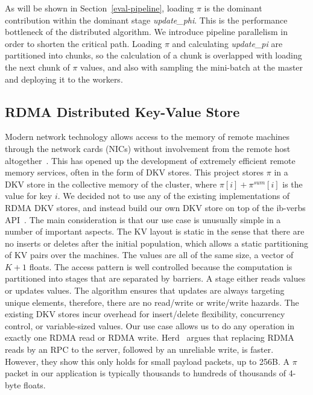 As will be shown in Section~\ref{eval-pipeline}, loading $\pi$ is the
dominant contribution within the dominant stage \textit{update\_phi}. This
is the performance bottleneck of the distributed algorithm. We introduce
pipeline parallelism in order to shorten the critical path. Loading $\pi$
and calculating \textit{update\_pi} are partitioned into chunks, so the
calculation of a chunk is overlapped with loading the next chunk of $\pi$
values, and also with sampling the mini-batch at the master and deploying
it to the workers.

\subsection{RDMA Distributed Key-Value Store}

Modern network technology allows access to the memory of remote machines
through the network cards (NICs) without involvement from the remote host
altogether~\cite{Hamada_infinibandtrade,Beck:2011:PER:2043535.2043537}.
This has opened up the development of
extremely efficient remote memory services, often in the form of DKV stores.
This project stores $\pi$ in a DKV store in the collective memory of the
cluster, where $\pi[i]+\pi^{sum}[i]$ is the value for key $i$. We decided not
to use any of the existing implementations of RDMA DKV stores, and instead
build our own DKV store on top of the ib-verbs API~\cite{ib-verbs}. The
main consideration is that our use case is unusually simple in a number
of important aspects. The KV layout is static in the sense that there are
no inserts or deletes after the initial population, which allows a static
partitioning of KV pairs over the machines. The values are all of the same size,
a vector of $K+1$ floats. The access pattern is well controlled because the
computation is partitioned into stages that are separated by barriers. A
stage either reads values or updates values. The algorithm ensures that updates
are always targeting unique elements,
therefore, there are no read/write or write/write hazards. The existing DKV stores incur
overhead for insert/delete flexibility, concurrency control, or variable-sized
values. Our use case allows us to do any operation in exactly one RDMA read
or RDMA write. Herd~\cite{Kalia:2014:URE:2740070.2626299} argues
that replacing RDMA reads by
an RPC to the server, followed by an unreliable write, is faster. However,
they show this only holds for small payload packets, up to 256B. A $\pi$
packet in our application is typically thousands to hundreds of thousands
of 4-byte floats.
